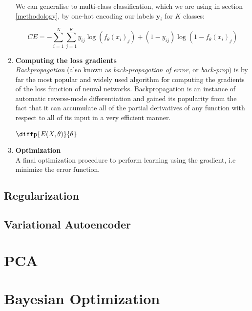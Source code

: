 \documentclass[bsc,frontabs,twoside,singlespacing,parskip,deptreport]{infthesis}     %
\begin{document}
\begin{enumerate}
We can generalise to multi-class classification, which we are using in section \ref{methodology}, by one-hot encoding our labels \(\mathbf{y}_{i}\) for \(K\) classes:

\begin{equation}
   CE = -\sum_{i=1}^{N} \sum_{j=1}^{K} y_{i j} \log \left(f_{\theta}\left(x_{i}\right)_{j}\right)+\left(1-y_{i j}\right) \log \left(1-f_{\theta}\left(x_{i}\right)_{j}\right)
\end{equation}

    
    \item{ \bf{Computing the loss gradients} } \\
    \textit{Backpropagation} (also known as \textit{back-propagation of error}, or \textit{back-prop}) \cite{rumelhart_learning_1986} is by far the most popular and widely used algorithm for computing the gradients of the loss function of neural networks. Backpropagation is an instance of automatic reverse-mode differentiation and gained its popularity from the fact that it can accumulate all of the partial derivatives of any function with respect to all of its input in a very efficient manner. 
    
     \(\diffp{E(X,\theta)}{\theta}\)
    \item{ \bf{Optimization} } \\ 
    A final optimization procedure to perform learning using the gradient, i.e minimize the error function.
\end{enumerate}

  



\subsection{Regularization}

\subsection{Variational Autoencoder}

\section{PCA}
\section{Bayesian Optimization}
\end{document}
